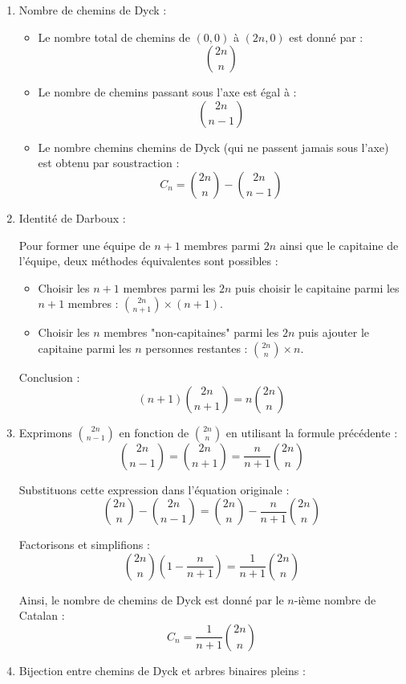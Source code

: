 \documentclass[10pt,a4paper]{article}
\begin{document}
\begin{enumerate}
    \item Nombre de chemins de Dyck :

    \begin{itemize}
        \item Le nombre total de chemins de \( (0,0) \) à \( (2n,0) \) est donné par :
        \[
        \binom{2n}{n}
        \]
        \item  Le nombre de chemins passant sous l'axe est égal à :
        \[
        \binom{2n}{n-1}
        \]
        \item Le nombre chemins chemins de Dyck (qui ne passent jamais sous l'axe) est obtenu par
        soustraction :
        \[
        C_n = \binom{2n}{n} - \binom{2n}{n-1}
        \]
    \end{itemize}

    \item Identité de Darboux :

    Pour former une équipe de \( n + 1 \) membres parmi \( 2n \) ainsi que le capitaine de l'équipe,
    deux méthodes équivalentes sont possibles :
    \begin{itemize}
        \item Choisir les \( n + 1 \) membres parmi les \( 2n \) puis choisir le capitaine parmi les
        \( n + 1 \) membres : \(\binom{2n}{n+1} \times (n+1)\).
        \item Choisir les \( n \) membres "non-capitaines"  parmi les \( 2n \) puis ajouter le
        capitaine parmi les \( n \) personnes restantes : \(\binom{2n}{n} \times n\).
    \end{itemize}
    Conclusion : $$ (n+1)\binom{2n}{n+1} = n\binom{2n}{n} $$

    \item Exprimons $\binom{2n}{n-1}$ en fonction de $\binom{2n}{n}$ en utilisant la formule
    précédente :
    $$\binom{2n}{n-1} = \binom{2n}{n+1} = \frac{n}{n+1}\binom{2n}{n}$$

    Substituons cette expression dans l'équation originale :
    $$\binom{2n}{n} - \binom{2n}{n-1} = \binom{2n}{n} - \frac{n}{n+1}\binom{2n}{n}$$

    Factorisons et simplifions :
    $$\binom{2n}{n}\left(1 - \frac{n}{n+1}\right) = \frac{1}{n+1}\binom{2n}{n}$$

    Ainsi, le nombre de chemins de Dyck est donné par le $n$-ième nombre de Catalan :
    \[ C_n = \frac{1}{n+1} \binom{2n}{n} \]

    \item Bijection entre chemins de Dyck et arbres binaires pleins :


\end{enumerate}
\end{document}
